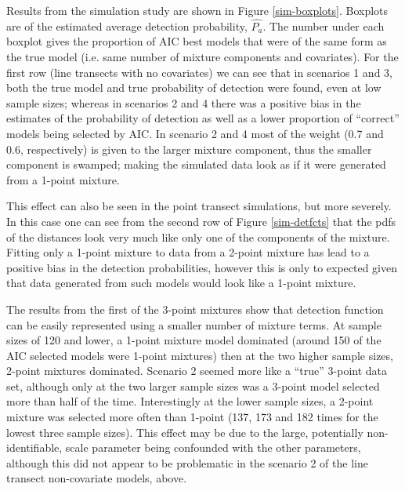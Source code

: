 \documentclass[useAMS,referee, usegraphicx]{biom}
\begin{document}
Results from the simulation study are shown in Figure \ref{sim-boxplots}. Boxplots are of the estimated average detection probability, $\hat{P_a}$. The number under each boxplot gives the proportion of AIC best models that were of the same form as the true model (i.e. same number of mixture components and covariates). For the first row (line transects with no covariates) we can see that in scenarios 1 and 3, both the true model and true probability of detection were found, even at low sample sizes; whereas in scenarios 2 and 4 there was a positive bias in the estimates of the probability of detection as well as a lower proportion of ``correct'' models being selected by AIC. In scenario 2 and 4 most of the weight (0.7 and 0.6, respectively) is given to the larger mixture component, thus the smaller component is swamped; making the simulated data look as if it were generated from a 1-point mixture.

This effect can also be seen in the point transect simulations, but more severely. In this case one can see from the second row of Figure \ref{sim-detfcts} that the pdfs of the distances look very much like only one of the components of the mixture. Fitting only a 1-point mixture to data from a 2-point mixture has lead to a positive bias in the detection probabilities, however this is only to expected given that data generated from such models would look like a 1-point mixture.

The results from the first of the 3-point mixtures show that detection function can be easily represented using a smaller number of mixture terms. At sample sizes of 120 and lower, a 1-point mixture model dominated (around 150 of the AIC selected models were 1-point mixtures) then at the two higher sample sizes, 2-point mixtures dominated. Scenario 2 seemed more like a ``true'' 3-point data set, although only at the two larger sample sizes was a 3-point model selected more than half of the time. Interestingly at the lower sample sizes, a 2-point mixture was selected more often than 1-point (137, 173 and 182 times for the lowest three sample sizes). This effect may be due to the large, potentially non-identifiable, scale parameter being confounded with the other parameters, although this did not appear to be problematic in the scenario 2 of the line transect non-covariate models, above.
\end{document}
